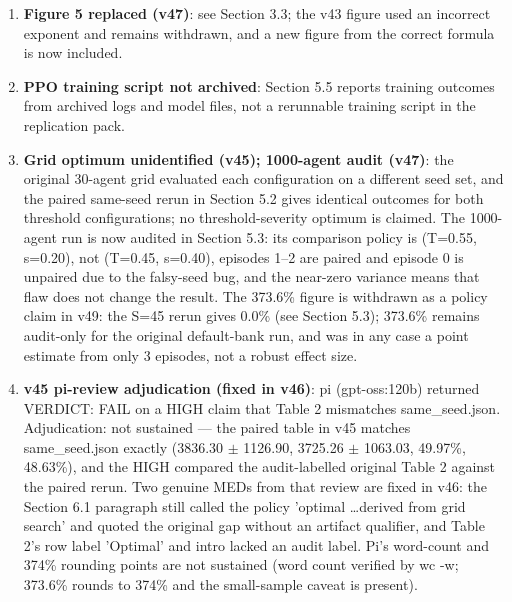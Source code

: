 \documentclass[11pt]{article}
\begin{document}
\begin{enumerate}
\item \textbf{Figure 5 replaced (v47)}: see Section 3.3; the v43 figure used an incorrect exponent and remains withdrawn, and a new figure from the correct formula is now included.
\item \textbf{PPO training script not archived}: Section 5.5 reports training outcomes from archived logs and model files, not a rerunnable training script in the replication pack.
\item \textbf{Grid optimum unidentified (v45); 1000-agent audit (v47)}: the original 30-agent grid evaluated each configuration on a different seed set, and the paired same-seed rerun in Section 5.2 gives identical outcomes for both threshold configurations; no threshold-severity optimum is claimed. The 1000-agent run is now audited in Section 5.3: its comparison policy is (T=0.55, s=0.20), not (T=0.45, s=0.40), episodes 1--2 are paired and episode 0 is unpaired due to the falsy-seed bug, and the near-zero variance means that flaw does not change the result. The 373.6\% figure is withdrawn as a policy claim in v49: the S=45 rerun gives 0.0\% (see Section 5.3); 373.6\% remains audit-only for the original default-bank run, and was in any case a point estimate from only 3 episodes, not a robust effect size.
\item \textbf{v45 pi-review adjudication (fixed in v46)}: pi (gpt-oss:120b) returned VERDICT: FAIL on a HIGH claim that Table 2 mismatches same\_seed.json. Adjudication: not sustained --- the paired table in v45 matches same\_seed.json exactly (3836.30 $\pm$ 1126.90, 3725.26 $\pm$ 1063.03, 49.97\%, 48.63\%), and the HIGH compared the audit-labelled original Table 2 against the paired rerun. Two genuine MEDs from that review are fixed in v46: the Section 6.1 paragraph still called the policy 'optimal \ldots derived from grid search' and quoted the original gap without an artifact qualifier, and Table 2's row label 'Optimal' and intro lacked an audit label. Pi's word-count and 374\% rounding points are not sustained (word count verified by wc -w; 373.6\% rounds to 374\% and the small-sample caveat is present).
\end{enumerate}
\end{document}
